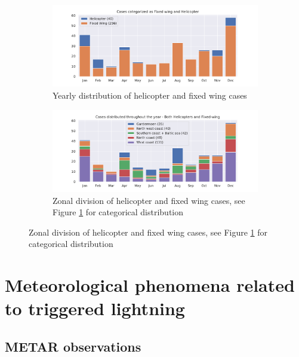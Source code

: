 \begin{figure}[H]
    \begin{subfigure}{\textwidth}
    \centering
    \includegraphics[width=\textwidth]{Figures/helivsfw.pdf}
    \caption{Yearly distribution of helicopter and fixed wing cases}
    \label{fig:helivsfw}
    \end{subfigure}
    
    \begin{subfigure}{\textwidth}
    \centering
    \includegraphics[width=\textwidth]{Figures/soner.pdf}
    \caption{Zonal division of helicopter and fixed wing cases, see Figure \ref{fig:helivsfw} for categorical distribution}
    \label{fig:soner}
    \end{subfigure}
\end{figure}

\section{Meteorological phenomena related to triggered lightning}

\subsection{METAR observations}

